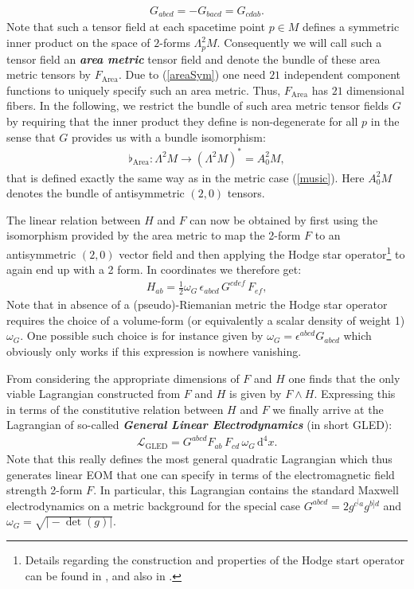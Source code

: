 \begin{align}\label{areaSym}
    G_{abcd} = -G_{bacd} = G_{cdab}.
\end{align}
Note that such a tensor field at each spacetime point $p\in M$ defines a symmetric inner product on the space of $2$-forms $\Lambda^2_pM$. Consequently we will call such a tensor field an \textbf{\textit{area metric}} tensor field and denote the bundle of these area metric tensors by $F_{\text{Area}}$. Due to (\ref{areaSym}) one need $21$ independent component functions to uniquely specify such an area metric. Thus, $F_{\text{Area}}$ has $21$ dimensional fibers. In the following, we restrict the bundle of such area metric tensor fields $G$ by requiring that the inner product they define is non-degenerate for all $p$ in the sense that $G$ provides us with a bundle isomorphism: 
\begin{align}
\flat_{\text{Area}} : \Lambda^2M \longrightarrow (\Lambda^2M)^{\ast} = A^2_0M,
\end{align}
that is defined exactly the same way as in the metric case (\ref{music}). Here $A^2_0M$ denotes the bundle of antisymmetric $(2,0)$ tensors. 

The linear relation between $H$ and $F$ can now be obtained by first using the isomorphism provided by the area metric to map the 2-form $F$ to an antisymmetric $(2,0)$ vector field and then applying the Hodge star operator\footnote{Details regarding the construction and properties of the Hodge start operator can be found in \cite{Abraham:1988:MTA:50877}, and also in \cite{nlab:Hodge}.} to again end up with a 2 form. In coordinates we therefore get:
\begin{align}
    H_{ab} = \frac{1}{2} \omega_G \, \epsilon_{abcd} \, G^{cdef} \, F_{ef},
\end{align}
Note that in absence of a (pseudo)-Riemanian metric the Hodge star operator requires the choice of a volume-form (or equivalently a scalar density of weight 1) $\omega_G$. One possible such choice is for instance given by $\omega_G = \epsilon^{abcd}G_{abcd}$ which obviously only works if this expression is nowhere vanishing.

From considering the appropriate dimensions of $F$ and $H$ one finds that the only viable Lagrangian constructed from $F$ and $H$ is given by $F \wedge H$. Expressing this in terms of the constitutive relation between $H$ and $F$ we finally arrive at the Lagrangian of so-called \textbf{\textit{General Linear Electrodynamics}} (in short GLED):
\begin{align}
    \mathcal{L}_{\text{GLED}} =  G^{abcd}F_{ab} \, F_{cd} \, \omega_G \, \mathrm{d}^4x.
\end{align}
Note that this really defines the most general quadratic Lagrangian which thus generates linear EOM that one can specify in terms of the electromagnetic field strength 2-form $F$. In particular, this Lagrangian contains the standard Maxwell electrodynamics on a metric background for the special case $G^{abcd} = 2 g^{c^[a}g^{b]d}$ and $\omega_{G}=\sqrt{\vert -\operatorname{det}(g) \vert}$.

